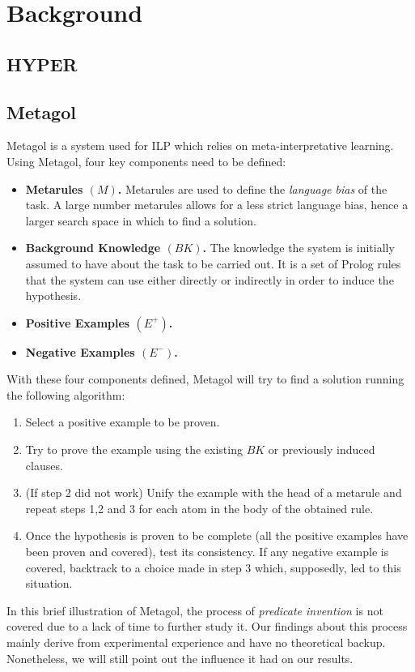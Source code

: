 \section{Background}\label{sec:back}

\subsection{HYPER}
\subsection{Metagol}
Metagol is a system used for ILP which relies on meta-interpretative learning.\\
Using Metagol, four key components need to be defined:
\begin{itemize}
    \item \textbf{Metarules \((M)\).} Metarules are used to define the \emph{language bias} of the task. A large number metarules allows for a less strict language bias, hence a larger search space in which to find a solution. 
    \item \textbf{Background Knowledge \((BK)\).} The knowledge the system is initially assumed to have about the task to be carried out. It is a set of Prolog rules that the system can use either directly or indirectly in order to induce the hypothesis.
    \item \textbf{Positive Examples \((E^+)\).}
    \item \textbf{Negative Examples \((E^-)\).}
\end{itemize}
With these four components defined, Metagol will try to find a solution running the following algorithm:
\begin{enumerate}
    \item Select a positive example to be proven.
    \item Try to prove the example using the existing \(BK\) or previously induced clauses.
    \item (If step 2 did not work) Unify the example with the head of a metarule and repeat steps 1,2 and 3 for each atom in the body of the obtained rule.
    \item Once the hypothesis is proven to be complete (all the positive examples have been proven and covered), test its consistency. If any negative example is covered, backtrack to a choice made in step 3 which, supposedly, led to this situation.
\end{enumerate}
In this brief illustration of Metagol, the process of \emph{predicate invention} is not covered due to a lack of time to further study it. Our findings about this process mainly derive
from experimental experience and have no theoretical backup. Nonetheless, we will still point out the influence it had on our results.


